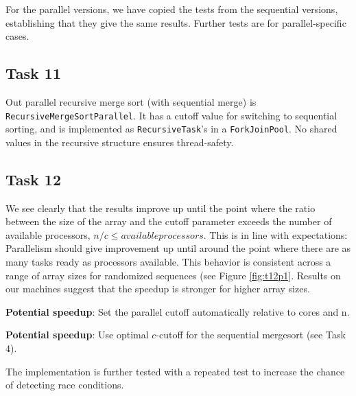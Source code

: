 \documentclass[11pt, a4paper]{article}
\begin{document}
For the parallel versions, we have copied the tests from the sequential versions, establishing that they give the same results. 
Further tests are for parallel-specific cases.

\subsection{Task 11}

Out parallel recursive merge sort (with sequential merge) is \texttt{Recursive\-MergeSort\-Parallel}. It has a cutoff value for switching to sequential sorting, and is implemented as \texttt{Recursive\-Task}'s in a \texttt{Fork\-Join\-Pool}. No shared values in the recursive structure ensures thread-safety.

\subsection{Task 12}

We see clearly that the results improve up until the point where the ratio between
the size of the array and the cutoff parameter exceeds the number of available processors,
$n / c \leq available processors$.
This is in line with expectations: Parallelism should give improvement up until around the point where there are as many tasks ready as processors available.
This behavior is consistent across a range of array sizes for randomized sequences (see Figure \ref{fig:t12p1}.
Results on our machines suggest that the speedup is stronger for higher array sizes.

\textbf{Potential speedup}: Set the parallel cutoff automatically relative to cores and n.

\textbf{Potential speedup}: Use optimal $c$-cutoff for the sequential mergesort (see Task 4).

The implementation is further tested with a repeated test to increase the chance of detecting race conditions.
\end{document}
